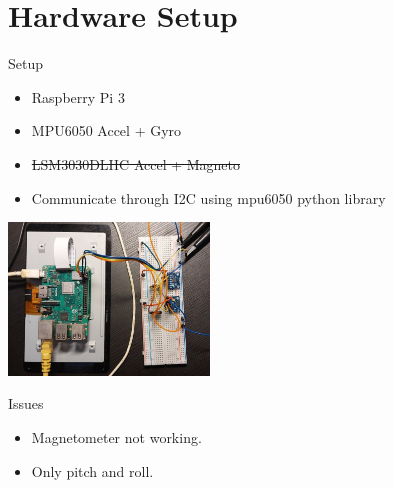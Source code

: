 \section{Hardware Setup}
\begin{frame}{Setup}
\begin{itemize}
\item Raspberry Pi 3
\item MPU6050 Accel + Gyro
\item \sout{LSM3030DLHC Accel + Magneto}
\item Communicate through I2C using mpu6050 python library
\end{itemize}

\begin{center}
\includegraphics[width=0.4\textwidth]{figures/setup.jpeg}
\end{center}
\end{frame}

\begin{frame}{Issues}
\begin{itemize}
\item Magnetometer not working.
\item Only pitch and roll.
\end{itemize}
\end{frame}
